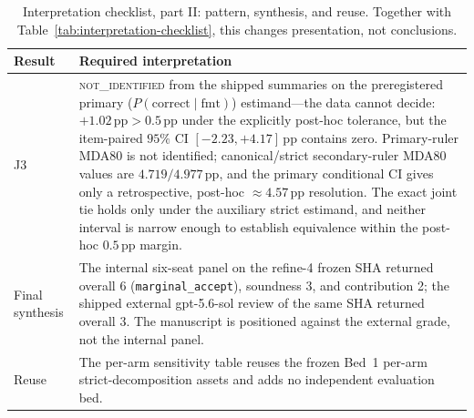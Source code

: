 \documentclass{article}
\newcommand{\PcFmt}{P(\mathrm{correct}\mid\mathrm{fmt})}
\newcommand{\pp}{\,\mathrm{pp}}
\begin{document}
\begin{table}[H]
\centering\small
\setlength{\tabcolsep}{4pt}
\renewcommand{\arraystretch}{1.08}
\begin{tabular}{@{}>{\raggedright\arraybackslash}p{2.1cm}
                    >{\raggedright\arraybackslash}p{11.0cm}@{}}
\toprule
Result & Required interpretation \\
\midrule
J3 & \textsc{not\_identified} from the shipped summaries on the preregistered
primary ($\PcFmt$) estimand---the data cannot decide:
$+1.02\pp > 0.5\pp$ under the explicitly post-hoc tolerance, but the
item-paired $95\%$ CI
$[-2.23,+4.17]\pp$ contains zero.  Primary-ruler MDA80 is not identified;
canonical/strict secondary-ruler MDA80 values are $4.719/4.977\pp$, and the
primary conditional CI gives only a retrospective, post-hoc
$\approx4.57\pp$ resolution.  The exact joint
tie holds only under the auxiliary strict estimand, and neither interval is
narrow enough to establish equivalence within the post-hoc $0.5\pp$ margin. \\
Final synthesis & The internal six-seat panel on the refine-4 frozen SHA
returned overall 6 (\texttt{marginal\_accept}), soundness 3, and contribution
2; the shipped external gpt-5.6-sol review of the same SHA returned overall 3.
The manuscript is positioned against the external grade, not the internal
panel. \\
Reuse & The per-arm sensitivity table reuses the frozen Bed~1 per-arm
strict-decomposition assets and adds no independent evaluation bed. \\
\bottomrule
\end{tabular}
\caption{Interpretation checklist, part II: pattern, synthesis, and reuse.
Together with Table~\ref{tab:interpretation-checklist}, this changes
presentation, not conclusions.}
\label{tab:interpretation-checklist-continued}
\end{table}
\end{document}
